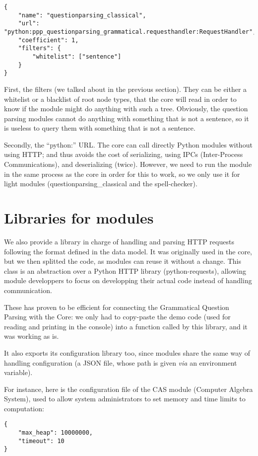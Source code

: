 \begin{verbatim}
{
    "name": "questionparsing_classical",
    "url": "python:ppp_questionparsing_grammatical.requesthandler:RequestHandler",
    "coefficient": 1,
    "filters": {
        "whitelist": ["sentence"]
    }
}
\end{verbatim}

First, the filters (we talked about in the previous section). They can be
either a whitelist or a blacklist of root node types, that the core will
read in order to know if the module might do anything with such a tree.
Obviously, the question parsing modules cannot do anything with something
that is not a sentence, so it is useless to query them with something that
is not a sentence.

Secondly, the “python:” URL. The core can call directly Python modules
without using HTTP; and thus avoids the cost of serializing, using IPCs
(Inter-Process Communications), and deserializing (twice).
However, we need to run the module in the same process as the core in
order for this to work, so we only use it for light modules
(questionparsing\_classical and the spell-checker).

\section{Libraries for modules}

We also provide a library in charge of handling and parsing HTTP
requests following the format defined in the data model. It was originally
used in the core, but we then splitted the code, as modules can reuse
it without a change.
This class is an abstraction over a Python HTTP library (python-requests),
allowing module developpers to focus on developping their actual code
instead of handling communication.

These has proven to be efficient for connecting the Grammatical Question Parsing
with the Core: we only had to copy-paste the demo code
(used for reading and printing in the console) into a function called
by this library, and it was working as is.

It also exports its configuration library too, since modules share the
same way of handling configuration (a JSON file, whose path
is given {\em via} an environment variable).

For instance, here is the configuration file of the CAS module (Computer Algebra
System), used to allow system administrators to set memory and time limits
to computation:

\begin{verbatim}
{
    "max_heap": 10000000,
    "timeout": 10
}
\end{verbatim}
